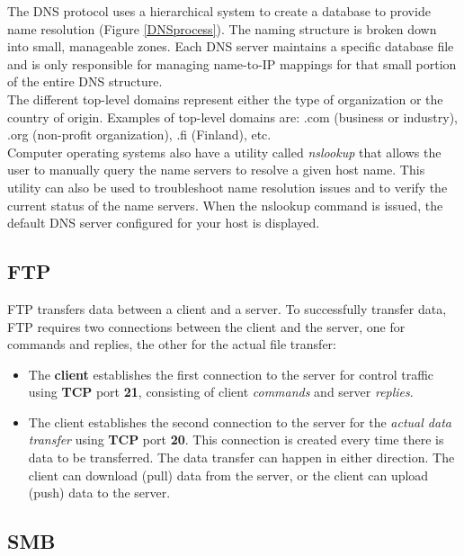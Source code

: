 {The DNS protocol uses a hierarchical system to create a database to provide name resolution (Figure \ref{DNSprocess}). The naming structure is broken down into small, manageable zones. Each DNS server maintains a specific database file and is only responsible for managing name-to-IP mappings for that small portion of the entire DNS structure.\\

The different top-level domains represent either the type of organization or the country of origin. Examples of top-level domains are: .com (business or industry), .org (non-profit organization), .fi (Finland), etc.\\

Computer operating systems also have a utility called \emph{nslookup} that allows the user to manually query the name servers to resolve a given host name. This utility can also be used to troubleshoot name resolution issues and to verify the current status of the name servers. When the nslookup command is issued, the default DNS server configured for your host is displayed. 

\subsection{FTP}

FTP transfers data between a client and a server. To successfully transfer data, FTP requires two connections between the client and the server, one for commands and replies, the other for the actual file transfer:

\begin{itemize}
\item The \textbf{client} establishes the first connection to the server for control traffic using \textbf{TCP} port \textbf{21}, consisting of client \emph{commands} and server \emph{replies}.

\item The client establishes the second connection to the server for the \emph{actual data transfer} using \textbf{TCP} port \textbf{20}. This connection is created every time there is data to be transferred. The data transfer can happen in either direction. The client can download (pull) data from the server, or the client can upload (push) data to the server.
\end{itemize}

\subsection{SMB}

}
